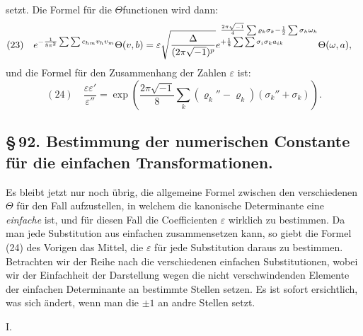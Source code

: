 \documentclass[10pt]{article}
\begin{document}
setzt. Die Formel für die \(\Theta\)functionen wird dann:
\[
\begin{aligned}
(23)\quad
e^{-\frac{1}{8\pi^2}\sum\sum c_{hm}v_hv_m}\Theta(v,b)
={}&\varepsilon\sqrt{\frac{\Delta}{(2\pi\sqrt{-1})^p}}
 e^{\begin{subarray}{l}\frac{2\pi\sqrt{-1}}4\sum\varrho_k\sigma_k-\frac12\sum\sigma_h\omega_h\\[0.1em]
 +\frac18\sum\sum\sigma_i\sigma_ka_{ik}\end{subarray}}\Theta(\omega,a),
\end{aligned}
\]
und die Formel für den Zusammenhang der Zahlen \(\varepsilon\) ist:
\[
(24)\quad
\frac{\varepsilon\varepsilon'}{\varepsilon''}
=\exp\!\left(\frac{2\pi\sqrt{-1}}8\sum_k(\varrho_k''-\varrho_k)(\sigma_k''+\sigma_k)\right).
\]

\subsection*{\S\,92. Bestimmung der numerischen Constante für die einfachen Transformationen.}

Es bleibt jetzt nur noch übrig, die allgemeine Formel zwischen den verschiedenen \(\Theta\) für den Fall aufzustellen, in welchem die kanonische Determinante eine \emph{einfache} ist, und für diesen Fall die Coefficienten \(\varepsilon\) wirklich zu bestimmen. Da man jede Substitution aus einfachen zusammensetzen kann, so giebt die Formel (24) des Vorigen das Mittel, die \(\varepsilon\) für jede Substitution daraus zu bestimmen. Betrachten wir der Reihe nach die verschiedenen einfachen Substitutionen, wobei wir der Einfachheit der Darstellung wegen die nicht verschwindenden Elemente der einfachen Determinante an bestimmte Stellen setzen. Es ist sofort ersichtlich, was sich ändert, wenn man die \(\pm1\) an andre Stellen setzt.

\begin{center}I.\end{center}
\end{document}
